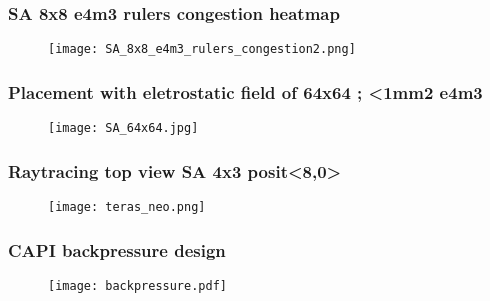 \begin{frame}
    \frametitle{SA 8x8 e4m3 rulers congestion heatmap}
    \begin{figure}[H]
        \centering
        \texttt{[image: SA\_8x8\_e4m3\_rulers\_congestion2.png]}
    \end{figure}
\end{frame}

\begin{frame}
    \frametitle{Placement with eletrostatic field of 64x64 ; <1mm2 e4m3}
    \begin{figure}[H]
        \centering
        \texttt{[image: SA\_64x64.jpg]}
    \end{figure}
\end{frame}

\begin{frame}
    \frametitle{Raytracing top view SA 4x3 posit<8,0>}
    \begin{figure}[H]
        \centering
        \texttt{[image: teras\_neo.png]}
    \end{figure}
\end{frame}

\begin{frame}
    \frametitle{CAPI backpressure design}
    \begin{figure}[H]
        \centering
        \texttt{[image: backpressure.pdf]}
    \end{figure}
\end{frame}

